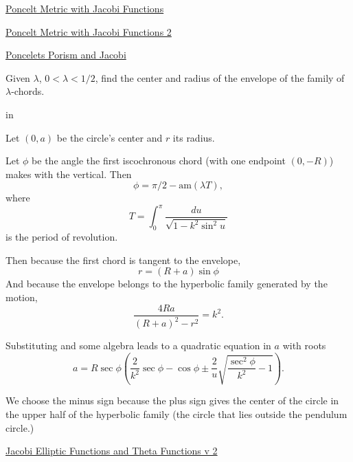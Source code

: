 \documentclass{ximera}
\newcommand{\pskip}{\vskip 0.1 in}
\begin{document}
\href{https://www.desmos.com/calculator/q16ify3gtm}{Poncelt Metric with Jacobi Functions}



\begin{onlineOnly}
    \begin{center}
\end{center}
\end{onlineOnly}

\href{https://www.desmos.com/calculator/hm5zop04ob}{Poncelt Metric with Jacobi Functions 2}



\begin{onlineOnly}
    \begin{center}
\end{center}
\end{onlineOnly}

\href{https://www.desmos.com/calculator/lwbypn9rje}{Poncelets Porism and Jacobi}



\begin{exploration}

Given $\lambda$, $0 < \lambda < 1/2$, find the center and radius of the envelope of the family of $\lambda$-chords. 

\pskip

Let $(0,a)$ be the circle's center and $r$ its radius.

Let $\phi$ be the angle the first iscochronous chord (with one endpoint $(0,-R)$) makes with the vertical. Then
\[
      \phi = \pi/2 - \text{am}(\lambda T) ,
\]
where
\[
  T = \int_0^{\pi} \frac{du}{\sqrt{1-k^2\sin^2 u}}
\] 
is the period of revolution.

Then because the first chord is tangent to the envelope,
\[
     r = (R+a) \sin \phi
\]
And because the envelope belongs to the hyperbolic family generated by the motion,
\[
  \frac{4Ra}{(R+a)^2 - r^2} = k^2 .
\]

Substituting and some algebra leads to a quadratic equation in $a$ with roots
\[
  a =   R \sec \phi \left( \frac{2}{k^2} \sec \phi - \cos\phi \pm   \frac{2}{u} \sqrt{\frac{\sec^2\phi}{k^2} - 1}   \right) .
\]

We choose the minus sign because the plus sign gives the center of the circle in the upper half of the hyperbolic family (the circle that lies outside the pendulum circle.)



\begin{onlineOnly}
    \begin{center}
\end{center}
\end{onlineOnly}

\href{https://www.desmos.com/calculator/svb8pwijet}{Jacobi Elliptic Functions and Theta Functions v 2}


\end{exploration}
\end{document}
